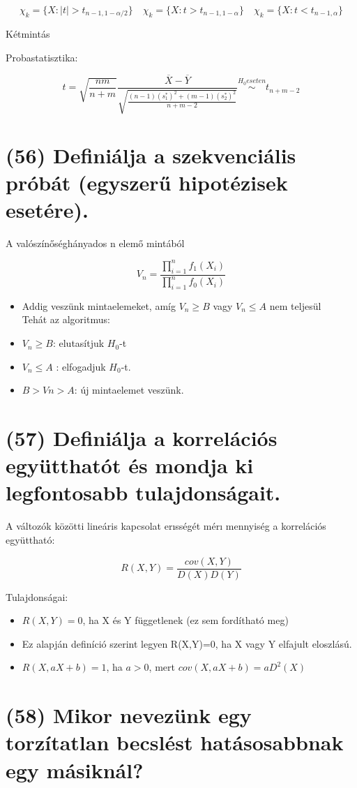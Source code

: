\documentclass[12p]{article}
\begin{document}
$$\chi_k = \{X: |t| > t_{n-1,1-\alpha/2}\} \quad \chi_k = \{X: t > t_{n-1,1-\alpha}\} \quad \chi_k = \{X: t < t_{n-1, \alpha}\}$$

Kétmintás

Probastatisztika:

$$\displaystyle{t = \sqrt{\frac{nm}{n+m}}\frac{\overline{X} - \overline{Y}}{\sqrt{\frac{(n-1)(s^*_1)^2 + (m-1)(s^*_2)^2}{n+m-2}}} \stackrel{H_0 eseten}{\sim}
t_{n+m-2}}$$

\section{(56) Definiálja a szekvenciális próbát (egyszerű hipotézisek esetére).}

A valószínőséghányados n elemő mintából

$$\displaystyle{V_n = \frac{\prod^n_{i=1} f_1(X_i)}{\prod^n_{i=1} f_0(X_i)}}$$

\begin{itemize}
\item Addig veszünk mintaelemeket, amíg $V_n \geq B$ vagy $V_n \leq A$ nem teljesül\\
Tehát az algoritmus:
\item $V_n \geq B$: elutasítjuk $H_0$-t
\item $V_n \leq A$ : elfogadjuk $H_0$-t.
\item $B>Vn>A$: új mintaelemet veszünk.
\end{itemize}

\section{(57) Definiálja a korrelációs együtthatót és mondja ki legfontosabb tulajdonságait.}

A változók közötti lineáris kapcsolat erısségét mérı
mennyiség a korrelációs együttható: 

$$R(X, Y) = \frac{cov(X,Y)}{D(X)D(Y)}$$

Tulajdonságai:

\begin{itemize}
\item $R(X,Y)=0$, ha X és Y függetlenek (ez sem
fordítható meg)
\item Ez alapján definíció szerint legyen R(X,Y)=0, ha X
vagy Y elfajult eloszlású.
\item $R(X,aX+b)=1$, ha $a>0$, mert $cov(X,aX+b)=aD^2(X)$
\end{itemize}


\section{(58) Mikor nevezünk egy torzítatlan becslést hatásosabbnak egy másiknál?}
\end{document}
